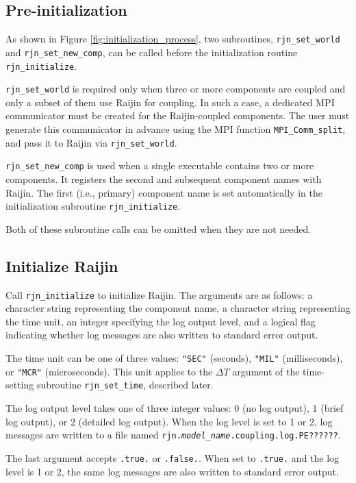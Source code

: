 \documentclass[11pt,a4paper]{report}
\newcommand{\figref}[1]{Figure \ref{#1}}
\begin{document}
\subsection{Pre-initialization}

As shown in \figref{fig:initialization_process},
two subroutines, \texttt{rjn\_set\_world}
and \texttt{rjn\_set\_new\_comp},
can be called before the initialization routine \texttt{rjn\_initialize}.

\texttt{rjn\_set\_world} is required only when
three or more components are coupled
and only a subset of them use Raijin for coupling.
In such a case, a dedicated MPI communicator
must be created for the Raijin-coupled components.
The user must generate this communicator in advance
using the MPI function \texttt{MPI\_Comm\_split},
and pass it to Raijin via \texttt{rjn\_set\_world}.

\texttt{rjn\_set\_new\_comp} is used
when a single executable contains two or more components.
It registers the second and subsequent component names with Raijin.
The first (i.e., primary) component name
is set automatically in the initialization subroutine
\texttt{rjn\_initialize}.

Both of these subroutine calls can be omitted
when they are not needed.

\subsection{Initialize Raijin}

Call \texttt{rjn\_initialize} to initialize Raijin.
The arguments are as follows:
a character string representing the component name,
a character string representing the time unit,
an integer specifying the log output level,
and a logical flag indicating whether log messages
are also written to standard error output.

The time unit can be one of three values:
\texttt{"SEC"} (seconds),
\texttt{"MIL"} (milliseconds),
or \texttt{"MCR"} (microseconds).
This unit applies to the $\Delta T$ argument
of the time-setting subroutine \texttt{rjn\_set\_time},
described later.

The log output level takes one of three integer values:
0 (no log output),
1 (brief log output),
or 2 (detailed log output).
When the log level is set to 1 or 2,
log messages are written to a file named
\texttt{rjn.\textit{model\_name}.coupling.log.PE??????}.

The last argument accepts \texttt{.true.} or \texttt{.false.}.
When set to \texttt{.true.}
and the log level is 1 or 2,
the same log messages are also written
to standard error output.
\end{document}
